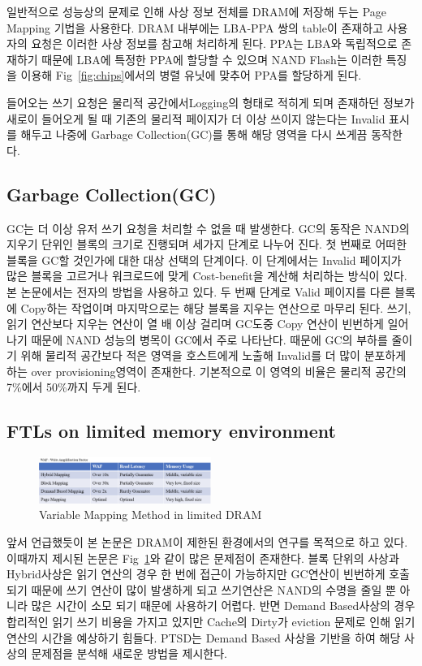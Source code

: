 \documentclass[conference]{IEEEtran}
\begin{document}
일반적으로 성능상의 문제로 인해 사상 정보 전체를 DRAM에 저장해 두는 Page Mapping 기법을 사용한다.
DRAM 내부에는 LBA-PPA 쌍의 table이 존재하고 사용자의 요청은 이러한 사상 정보를 참고해 처리하게 된다.
PPA는 LBA와 독립적으로 존재하기 때문에 LBA에 특정한 PPA에 할당할 수 있으며 NAND Flash는 이러한 특징을
이용해 Fig~\ref{fig:chips}에서의 병렬 유닛에 맞추어 PPA를 할당하게 된다.\par

들어오는 쓰기 요청은 물리적 공간에서Logging의 형태로 적히게 되며 존재하던 정보가 새로이 들어오게 될 때 기존의 물리적 페이지가 더 이상
쓰이지 않는다는 Invalid 표시를 해두고 나중에 Garbage Collection(GC)를 통해 해당 영역을 다시 쓰게끔 동작한다.

\subsection{Garbage Collection(GC)}

GC는 더 이상 유저 쓰기 요청을 처리할 수 없을 때 발생한다. GC의 동작은 NAND의 지우기 단위인 블록의 크기로
진행되며 세가지 단계로 나누어 진다. 첫 번째로 어떠한 블록을 GC할 것인가에 대한 대상 선택의 단계이다.
이 단계에서는 Invalid 페이지가 많은 블록을 고르거나 워크로드에 맞게 Cost-benefit을 계산해 처리하는 방식이 있다.
본 논문에서는 전자의 방법을 사용하고 있다. 두 번째 단계로 Valid 페이지를 다른 블록에 Copy하는 작업이며
마지막으로는 해당 블록을 지우는 연산으로 마무리 된다. 쓰기, 읽기 연산보다 지우는 연산이 열 배 이상 걸리며 
GC도중 Copy 연산이 빈번하게 일어나기 때문에 NAND 성능의 병목이 GC에서 주로 나타난다. 때문에 GC의 부하를
줄이기 위해 물리적 공간보다 적은 영역을 호스트에게 노출해 Invalid를 더 많이 분포하게 하는
over provisioning영역이 존재한다. 기본적으로 이 영역의 비율은 물리적 공간의 7\%에서 50\%까지 두게 된다.

\subsection{FTLs on limited memory environment}
\begin{figure}[h]
	\centering
	\includegraphics[width=0.5\textwidth]{image/bg/Map.png}
	\caption{Variable Mapping Method in limited DRAM}
	\label{fig:Map}
\end{figure}

앞서 언급했듯이 본 논문은 DRAM이 제한된 환경에서의 연구를 목적으로 하고 있다. 이때까지 제시된 논문은 
Fig~\ref{fig:Map}와 같이 많은 문제점이 존재한다. 블록 단위의 사상과 Hybrid사상은 읽기 연산의 경우 한 번에
접근이 가능하지만 GC연산이 빈번하게 호출되기 때문에 쓰기 연산이 많이 발생하게 되고 쓰기연산은 NAND의 수명을 
줄일 뿐 아니라 많은 시간이 소모 되기 때문에 사용하기 어렵다. 반면 Demand Based사상의 경우 합리적인 읽기 쓰기 
비용을 가지고 있지만 Cache의 Dirty가 eviction 문제로 인해 읽기 연산의 시간을 예상하기 힘들다.
PTSD는 Demand Based 사상을 기반을 하여 해당 사상의 문제점을 분석해 새로운 방법을 제시한다.
\end{document}
